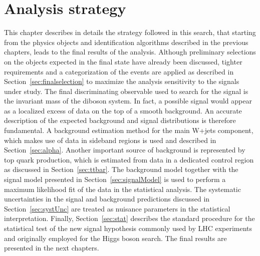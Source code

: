 \chapter{Analysis strategy}\label{ch:strategy}

This chapter describes in details the strategy followed in this search, that starting from the physics objects and identification algorithms described in the previous chapters, leads to the final results of the analysis.
Although preliminary selections on the objects expected in the final state have already been discussed, tighter requirements and a categorization of the events are applied as described in Section~\ref{sec:finalselection} to maximize the analysis sensitivity to the signals under study. The final discriminating observable used to search for the signal is the invariant mass of the diboson system. In fact, a possible signal would appear as a localized excess of data on the top of a smooth background. An accurate description of the expected background and signal distributions is therefore fundamental. A background estimation method for the main W+jets component, which makes use of data in sideband regions is used and described in Section~\ref{sec:alpha}. Another important source of background is represented by top quark production, which is estimated from data in a dedicated control region as discussed in Section~\ref{sec:ttbar}. The background model together with the signal model presented in Section~\ref{sec:signalModel} is used to perform a maximum likelihood fit of the data in the statistical analysis.
The systematic uncertainties in the signal and background predictions discussed in Section~\ref{sec:systUnc} are treated as nuisance parameters in the statistical interpretation.
Finally, Section~\ref{sec:stat} describes the standard procedure for the statistical test of the new signal hypothesis commonly used by LHC experiments and originally employed for the Higgs boson search.
The final results are presented in the next chapters.

 
  
 
 
